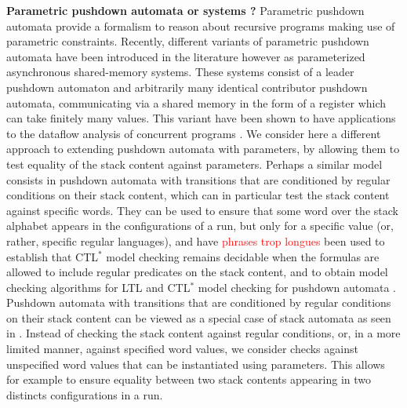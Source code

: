 \documentclass[a4paper,UKenglish,cleveref, autoref, thm-restate]{lipics-v2021}
\begin{document}
{\bf Parametric pushdown automata or systems ?}
 Parametric pushdown automata provide a  formalism to
reason about 
recursive programs
making use of parametric constraints.
Recently, different variants of parametric pushdown automata have been introduced in the literature 
\cite{hague2011parameterised, esparza2016parameterized, fortin2017model} 
however as
parameterized asynchronous shared-memory systems.
These systems consist of a leader pushdown automaton
and arbitrarily many identical contributor pushdown automata, communicating via a shared memory
in the form of a register which can take finitely many values.
This variant have been shown to have applications
to the dataflow analysis of concurrent programs \cite{kahlon2008parameterization}. 
We consider here a different approach to extending pushdown automata with parameters, by allowing them to test equality of the stack content against parameters.
Perhaps a similar model consists in 
pushdown automata 
with transitions that are conditioned by regular conditions on their stack content, which
can in particular
test the
stack content against
specific words. 
They can be used to ensure that some word over the stack alphabet appears in the configurations of a run, but only for a specific value (or, rather, specific regular languages),
and have \textcolor{red}{ phrases trop longues}
been used to establish that CTL$^*$ model checking remains decidable
when the formulas are allowed to include regular predicates on the stack content,
and to obtain 
model checking algorithms for LTL and CTL$^*$ model checking
for
pushdown automata \cite{finkel1997direct}.
Pushdown automata 
with transitions that are conditioned by regular conditions on their stack content
can be viewed as
a special case of stack automata as seen in \cite{hopcroft1969formal}.
Instead
of checking the stack content against regular conditions, or, in a more limited manner,
against specified word values,
we consider
checks against unspecified word values that can be instantiated using parameters.
This allows for example to ensure equality between two stack contents appearing in two distincts configurations in a run.
\end{document}
